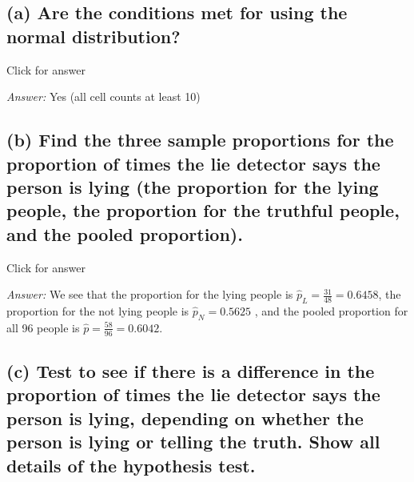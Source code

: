 \documentclass[
]{book}
\begin{document}
\hypertarget{a-are-the-conditions-met-for-using-the-normal-distribution}{%
\subsection{(a) Are the conditions met for using the normal distribution?}\label{a-are-the-conditions-met-for-using-the-normal-distribution}}

Click for answer

\emph{Answer:} Yes (all cell counts at least 10)

\hypertarget{b-find-the-three-sample-proportions-for-the-proportion-of-times-the-lie-detector-says-the-person-is-lying-the-proportion-for-the-lying-people-the-proportion-for-the-truthful-people-and-the-pooled-proportion.}{%
\subsection{(b) Find the three sample proportions for the proportion of times the lie detector says the person is lying (the proportion for the lying people, the proportion for the truthful people, and the pooled proportion).}\label{b-find-the-three-sample-proportions-for-the-proportion-of-times-the-lie-detector-says-the-person-is-lying-the-proportion-for-the-lying-people-the-proportion-for-the-truthful-people-and-the-pooled-proportion.}}

Click for answer

\emph{Answer:} We see that the proportion for the lying people is \(\hat{p}_L = \frac{31}{48}= 0.6458\), the proportion for the not lying people is \(\hat{p}_N = 0.5625\) , and the pooled proportion for all 96 people is \(\hat{p} = \frac{58}{96}= 0.6042\).

\hypertarget{c-test-to-see-if-there-is-a-difference-in-the-proportion-of-times-the-lie-detector-says-the-person-is-lying-depending-on-whether-the-person-is-lying-or-telling-the-truth.-show-all-details-of-the-hypothesis-test.}{%
\subsection{(c) Test to see if there is a difference in the proportion of times the lie detector says the person is lying, depending on whether the person is lying or telling the truth. Show all details of the hypothesis test.}\label{c-test-to-see-if-there-is-a-difference-in-the-proportion-of-times-the-lie-detector-says-the-person-is-lying-depending-on-whether-the-person-is-lying-or-telling-the-truth.-show-all-details-of-the-hypothesis-test.}}
\end{document}
